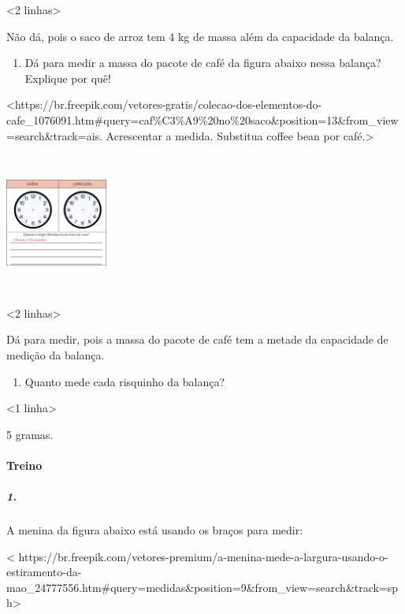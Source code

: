 \textless{}2 linhas\textgreater{}

Não dá, pois o saco de arroz tem 4 kg de massa além da capacidade da
balança.

\begin{enumerate}
\def\labelenumi{\alph{enumi})}
\item
  Dá para medir a massa do pacote de café da figura abaixo nessa
  balança? Explique por quê!
\end{enumerate}

\textless{}https://br.freepik.com/vetores-gratis/colecao-dos-elementos-do-cafe\_1076091.htm\#query=caf\%C3\%A9\%20no\%20saco\&position=13\&from\_view=search\&track=ais.
Acrescentar a medida. Substitua coffee bean por café.\textgreater{}

\includegraphics[width=1.32094in,height=1.80208in]{media/image54.png}

\textless{}2 linhas\textgreater{}

Dá para medir, pois a massa do pacote de café tem a metade da capacidade
de medição da balança.

\begin{enumerate}
\def\labelenumi{\alph{enumi})}
\item
  Quanto mede cada risquinho da balança?
\end{enumerate}

\textless{}1 linha\textgreater{}

5 gramas.

\paragraph{Treino}\label{treino-2}

\subparagraph{1.}\label{section-39}

A menina da figura abaixo está usando os braços para medir:

\textless{}
https://br.freepik.com/vetores-premium/a-menina-mede-a-largura-usando-o-estiramento-da-mao\_24777556.htm\#query=medidas\&position=9\&from\_view=search\&track=sph\textgreater{}


